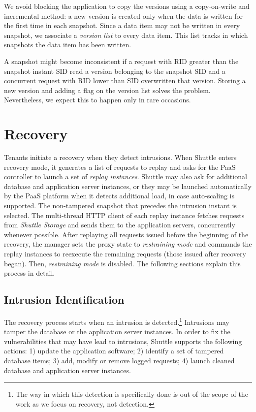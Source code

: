 \documentclass[10pt,conference]{IEEEtran}
\newcommand{\LONG}[1]{}
\begin{document}
We avoid blocking the application to copy the versions using a copy-on-write and incremental method: a new version is created only when the data is written for the first time in each snapshot. Since a data item may not be written in every snapshot, we associate a \emph{version list} to every data item. This list tracks in which snapshots the data item has been written.

A snapshot might become inconsistent if a request with \ac{RID} greater than the snapshot instant \ac{SID} read a version belonging to the snapshot \ac{SID} and a concurrent request with \ac{RID} lower than \ac{SID} overwritten that version. Storing a new version and adding a flag on the version list solves the problem. Nevertheless, we expect this to happen only in rare occasions.





\section{Recovery}
\label{sec:recovery}

Tenants initiate a recovery when they detect intrusions. When Shuttle enters recovery mode, it generates a list of requests to replay and asks for the \ac{PaaS} controller to launch a set of \textit{replay instances}. Shuttle may also ask for additional database and application server instances, or they may be launched automatically by the \ac{PaaS} platform when it detects additional load, in case auto-scaling is supported. The non-tampered snapshot that precedes the intrusion instant is selected. The multi-thread HTTP client of each replay instance fetches requests from \emph{Shuttle Storage} and sends them to the application servers, concurrently whenever possible. After replaying all requests issued before the beginning of the recovery, the manager sets the proxy state to \emph{restraining mode} and commands the replay instances to reexecute the remaining requests (those issued after recovery began). Then, \emph{restraining mode} is disabled. 
The following sections explain this process in detail.


\subsection{Intrusion Identification}
\label{sec:recovery:detection}

The recovery process starts when an intrusion is detected.\footnote{The way in which this detection is specifically done is out of the scope of the work  as we focus on recovery, not detection.} Intrusions may tamper the database \LONG{, e.g., modifying data,}or the application server instances\LONG{, e.g., changing the code of the application}. In order to fix the vulnerabilities that may have lead to intrusions, Shuttle supports the following actions: 1) update the application software; 2) identify a set of tampered database items; 3) add, modify or remove logged requests; 4) launch cleaned database and application server instances.
\end{document}
